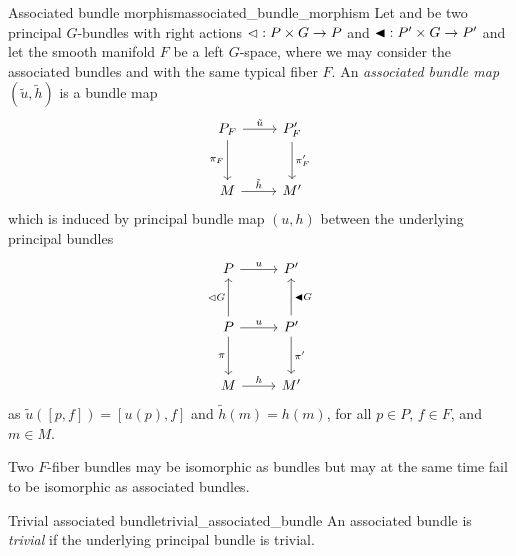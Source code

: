 \begin{definition}{Associated bundle morphism}{associated_bundle_morphism}
    Let  and  be two principal \(G\)-bundles with right actions \(\mathbin{\vartriangleleft} : P \times G \to P\) and \(\mathbin{\blacktriangleleft} : P' \times G \to P'\) and let the smooth manifold \(F\) be a left \(G\)-space, where we may consider the associated bundles  and  with the same typical fiber \(F\). An \emph{associated bundle map} \((\tilde{u}, \tilde{h})\) is a bundle map
    \begin{equation*}
        \begin{tikzcd}[column sep = normal, row sep = large]
            P_F \arrow{r}{\tilde{u}} \arrow[swap]{d}{\pi_F} & P'_F \arrow{d}{\pi'_F}\\
            M \arrow{r}{\tilde{h}} & M'
        \end{tikzcd}
    \end{equation*}
    which is induced by principal bundle map \((u, h)\) between the underlying principal bundles
    \begin{equation*}
        \begin{tikzcd}[column sep = normal, row sep = large]
            P \arrow{r}{u} & P'\\
            P \arrow{u}{\ract G} \arrow{r}{u} \arrow[swap]{d}{\pi} & P' \arrow[swap]{u}{\ractalt G} \arrow{d}{\pi'}\\
            M \arrow{r}{h} & M'
        \end{tikzcd}
    \end{equation*}
    as \(\tilde{u}([p,f]) = [u(p), f]\) and \(\tilde{h}(m) = h(m)\), for all \(p \in P\), \(f \in F\), and \(m \in M\).
\end{definition}
\begin{remark}
    Two \(F\)-fiber bundles may be isomorphic as bundles but may at the same time fail to be isomorphic as associated bundles.
\end{remark}

\begin{definition}{Trivial associated bundle}{trivial_associated_bundle}
    An associated bundle is \emph{trivial} if the underlying principal bundle is trivial.
\end{definition}

